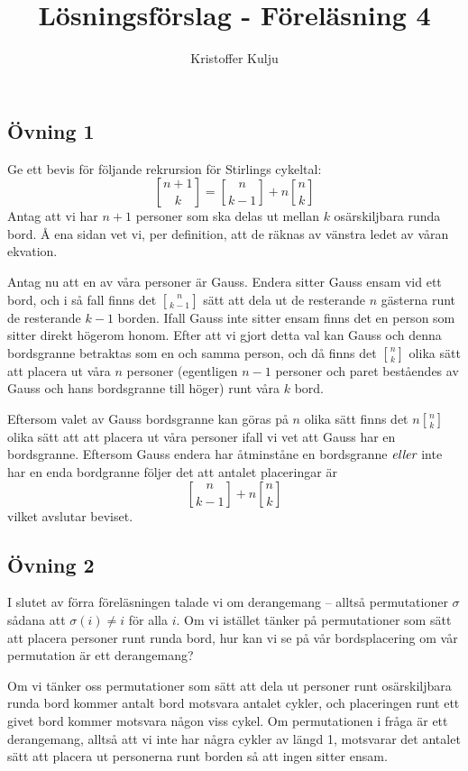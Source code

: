\documentclass{article}
\title{Lösningsförslag - Föreläsning 4}
\author{Kristoffer Kulju}
\begin{document}
\maketitle

\subsection*{Övning 1}
Ge ett bevis för följande rekrursion för Stirlings cykeltal:
$$
{n + 1 \brack k} = {n \brack k - 1} + n{n \brack k}
$$
Antag att vi har $n+1$ personer som ska delas ut mellan $k$ osärskiljbara runda bord. Å ena sidan vet vi, per definition, att de räknas av vänstra ledet av våran ekvation. 

Antag nu att en av våra personer är Gauss. Endera sitter Gauss ensam vid ett bord, och i så fall finns det ${n \brack k - 1}$ sätt att dela ut de resterande $n$ gästerna runt de resterande $k-1$ borden. Ifall Gauss inte sitter ensam finns det en person som sitter direkt högerom honom. Efter att vi gjort detta val kan Gauss och denna bordsgranne betraktas som en och samma person, och då finns det ${n \brack k}$ olika sätt att placera ut våra $n$ personer (egentligen $n - 1$ personer och paret beståendes av Gauss och hans bordsgranne till höger) runt våra $k$ bord. 

Eftersom valet av Gauss bordsgranne kan göras på $n$ olika sätt finns det $n{n \brack k}$ olika sätt att att placera ut våra personer ifall vi vet att Gauss har en bordsgranne. Eftersom Gauss endera har åtminståne en bordsgranne $\emph{eller}$ inte har en enda bordgranne följer det att antalet placeringar är $$
{n \brack k - 1} + n{n \brack k}
$$ vilket avslutar beviset.
 
\subsection*{Övning 2}
I slutet av förra föreläsningen talade vi om derangemang – alltså permutationer $\sigma$ sådana att $\sigma(i)\neq i$ för alla $i$. Om vi istället tänker på permutationer som sätt att placera personer runt runda bord, hur kan vi se på vår bordsplacering om vår permutation är ett derangemang?

Om vi tänker oss permutationer som sätt att dela ut personer runt osärskiljbara runda bord kommer antalt bord motsvara antalet cykler, och placeringen runt ett givet bord kommer motsvara någon viss cykel. Om permutationen i fråga är ett derangemang, alltså att vi inte har några cykler av längd 1, motsvarar det antalet sätt att placera ut personerna runt borden så att ingen sitter ensam. 
\end{document}
